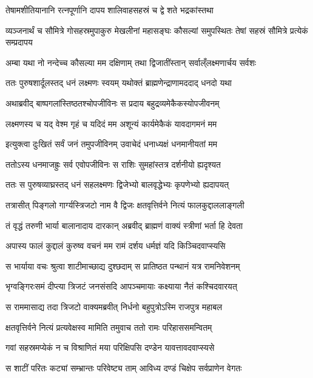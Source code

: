 \twolineshloka
{तेषामशीतियानानि रत्नपूर्णानि दापय}
{शालिवाहसहस्रं च द्वे शते भद्रकांस्तथा} %

\threelineshloka
{व्यञ्जनार्थं च सौमित्रे गोसहस्रमुपाकुरु}
{मेखलीनां महासङ्घः कौसल्यां समुपस्थितः}
{तेषां सहस्रं सौमित्रे प्रत्येकं सम्प्रदापय} %

\twolineshloka
{अम्बा यथा नो नन्देच्च कौसल्या मम दक्षिणाम्}
{तथा द्विजातींस्तान् सर्वाल्ँलक्ष्मणार्चय सर्वशः} %

\twolineshloka
{ततः पुरुषशार्दूलस्तद् धनं लक्ष्मणः स्वयम्}
{यथोक्तं ब्राह्मणेन्द्राणामददाद् धनदो यथा} %

\twolineshloka
{अथाब्रवीद् बाष्पगलांस्तिष्ठतश्चोपजीविनः}
{स प्रदाय बहुद्रव्यमेकैकस्योपजीवनम्} %

\twolineshloka
{लक्ष्मणस्य च यद् वेश्म गृहं च यदिदं मम}
{अशून्यं कार्यमेकैकं यावदागमनं मम} %

\twolineshloka
{इत्युक्त्वा दुःखितं सर्वं जनं तमुपजीविनम्}
{उवाचेदं धनाध्यक्षं धनमानीयतां मम} %

\twolineshloka
{ततोऽस्य धनमाजह्रुः सर्व एवोपजीविनः}
{स राशिः सुमहांस्तत्र दर्शनीयो ह्यदृश्यत} %

\twolineshloka
{ततः स पुरुषव्याघ्रस्तद् धनं सहलक्ष्मणः}
{द्विजेभ्यो बालवृद्धेभ्यः कृपणेभ्यो ह्यदापयत्} %

\twolineshloka
{तत्रासीत् पिङ्गलो गार्ग्यस्त्रिजटो नाम वै द्विजः}
{क्षतवृत्तिर्वने नित्यं फालकुद्दाललाङ्गली} %

\twolineshloka
{तं वृद्धं तरुणी भार्या बालानादाय दारकान्}
{अब्रवीद् ब्राह्मणं वाक्यं स्त्रीणां भर्ता हि देवता} %

\twolineshloka
{अपास्य फालं कुद्दालं कुरुष्व वचनं मम}
{रामं दर्शय धर्मज्ञं यदि किञ्चिदवाप्स्यसि} %

\twolineshloka
{स भार्याया वचः श्रुत्वा शाटीमाच्छाद्य दुश्छदाम्}
{स प्रातिष्ठत पन्थानं यत्र रामनिवेशनम्} %

\twolineshloka
{भृग्वङ्गिरःसमं दीप्त्या त्रिजटं जनसंसदि}
{आपञ्चमायाः कक्ष्याया नैतं कश्चिदवारयत्} %

\twolineshloka
{स राममासाद्य तदा त्रिजटो वाक्यमब्रवीत्}
{निर्धनो बहुपुत्रोऽस्मि राजपुत्र महाबल} %

\twolineshloka
{क्षतवृत्तिर्वने नित्यं प्रत्यवेक्षस्व मामिति}
{तमुवाच ततो रामः परिहाससमन्वितम्} %

\twolineshloka
{गवां सहस्रमप्येकं न च विश्राणितं मया}
{परिक्षिपसि दण्डेन यावत्तावदवाप्स्यसे} %

\twolineshloka
{स शाटीं परितः कट्यां सम्भ्रान्तः परिवेष्ट्य ताम्}
{आविध्य दण्डं चिक्षेप सर्वप्राणेन वेगतः} %

